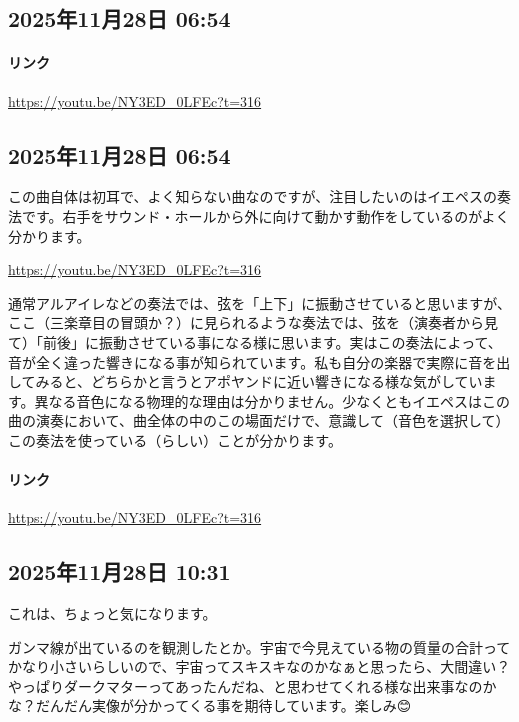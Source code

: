 \subsection*{2025年11月28日 06:54}

\paragraph{リンク}
\url{https://youtu.be/NY3ED_0LFEc?t=316}

\subsection*{2025年11月28日 06:54}

この曲自体は初耳で、よく知らない曲なのですが、注目したいのはイエペスの奏法です。右手をサウンド・ホールから外に向けて動かす動作をしているのがよく分かります。

\url{https://youtu.be/NY3ED_0LFEc?t=316}

通常アルアイレなどの奏法では、弦を「上下」に振動させていると思いますが、ここ（三楽章目の冒頭か？）に見られるような奏法では、弦を（演奏者から見て）「前後」に振動させている事になる様に思います。実はこの奏法によって、音が全く違った響きになる事が知られています。私も自分の楽器で実際に音を出してみると、どちらかと言うとアポヤンドに近い響きになる様な気がしています。異なる音色になる物理的な理由は分かりません。少なくともイエペスはこの曲の演奏において、曲全体の中のこの場面だけで、意識して（音色を選択して）この奏法を使っている（らしい）ことが分かります。

\paragraph{リンク}
\url{https://youtu.be/NY3ED_0LFEc?t=316}

\subsection*{2025年11月28日 10:31}

これは、ちょっと気になります。

ガンマ線が出ているのを観測したとか。宇宙で今見えている物の質量の合計ってかなり小さいらしいので、宇宙ってスキスキなのかなぁと思ったら、大間違い？やっぱりダークマターってあったんだね、と思わせてくれる様な出来事なのかな？だんだん実像が分かってくる事を期待しています。楽しみ😊

